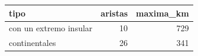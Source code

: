 \begin{tabular}{lrr}
\toprule
tipo & aristas & maxima\_km \\
\midrule
con un extremo insular & 10 & 729 \\
continentales & 26 & 341 \\
\bottomrule
\end{tabular}
